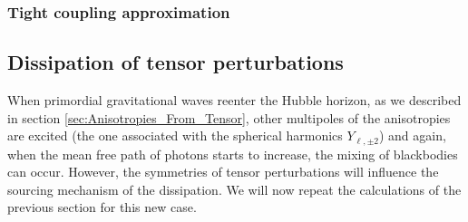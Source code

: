 \subsubsection{Tight coupling approximation}
\subsection{Dissipation of tensor perturbations}
When primordial gravitational waves reenter the Hubble horizon, as we described in section \ref{sec:Anisotropies_From_Tensor}, other multipoles of the anisotropies are excited (the one associated with the spherical harmonics $Y_{\ell,\pm2}$) and again, when the mean free path of photons starts to increase, the mixing of blackbodies can occur. However, the symmetries of tensor perturbations will influence the sourcing mechanism of the dissipation. We will now repeat the calculations of the previous section for this new case. 